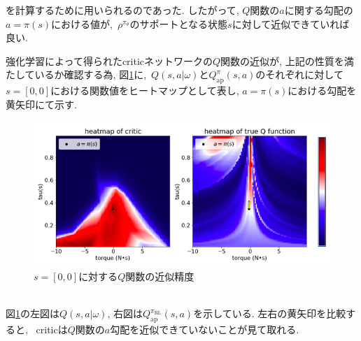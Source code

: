 \documentclass[dvipdfmx]{ampmt}
\begin{document}
を計算するために用いられるのであった. したがって, $Q$関数の$a$に関する勾配の$a=\pi(s)$における値が,~$\rho^{\pi_{\theta}}$のサポートとなる状態$s$に対して近似できていれば良い. \par
強化学習によって得られたcriticネットワークの$Q$関数の近似が, 上記の性質を満たしているか確認する為, 図\ref{heatmap}に,~$Q(s,a|\omega)とQ_{\textrm{ap}}^{\pi}(s,a)$のそれぞれに対して$s=[0,0]$における関数値をヒートマップとして表し, $a=\pi(s)$における勾配を黄矢印にて示す.
\begin{figure}[h]
	\centering
 	\includegraphics[width=13cm]{heatmap.png}
 	\caption{$s=[0,0]$に対する$Q$関数の近似精度} \label{heatmap}
\end{figure}\\
図\ref{heatmap}の左図は$Q(s,a|\omega)$, 右図は$Q_{\textrm{ap}}^{\pi_{\textrm{RL}}}(s,a)$を示している. 左右の黄矢印を比較すると, ~criticは$Q$関数の$a$勾配を近似できていないことが見て取れる.
\end{document}

